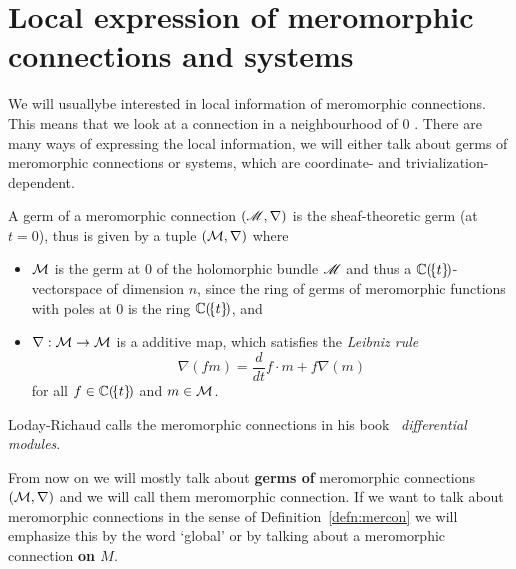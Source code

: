 \section{Local expression of meromorphic connections and systems}
We will usually\TODO[only?] be interested in local information of meromorphic
connections.  This means that we look at a connection in a neighbourhood of $0$
.
There are many ways of expressing the local information, we will either talk
about germs of meromorphic connections or systems, which are coordinate-
and trivialization-dependent.
\begin{prop}
  A germ of a meromorphic connection $(\mathscr{M},\nabla)$ is the sheaf-theoretic
  germ (at $t=0$), thus is given by a tuple $(\mathcal{M},\nabla)$ where
  \begin{itemize}
    \item $\mathcal{M}$ is the germ at $0$ of the holomorphic bundle $\mathscr{M}$ and thus a
      $\mathbb{C}(\!\{t\}\!)$-vectorspace of dimension $n$, since the ring of germs of
      meromorphic functions with poles at $0$ is the ring $\mathbb{C}(\!\{t\}\!)$, and
    \item $\nabla:\mathcal{M}\to \mathcal{M}$ is a additive map, which
      satisfies the \emph{Leibniz rule}
      \[
        \nabla(fm)=\frac{d}{dt} f\cdot m + f\nabla(m)
      \]
      for all $f\in\mathbb{C}(\!\{t\}\!)$ and $m\in \mathcal{M}$.
  \end{itemize}
  \begin{comment}
      \begin{s-rem}
      \marginnote{\cite{sabbah2007isomonodromic}}
      It is a $(\C(\!\{t\}\!),\nabla)$-vectorspace.
    \end{s-rem}
  \end{comment}
  \begin{s-rem}
    Loday-Richaud calls the meromorphic connections in his
    book~\cite[Def.4.2.1]{Loday2014} \emph{differential modules}.
  \end{s-rem}
\end{prop}
\begin{rem}\label{rem:GlobalNothingGerm}
  From now on we will mostly talk about \textbf{germs of} meromorphic
  connections $(\mathcal{M},\nabla)$ and we will call them meromorphic connection. If
  we want to talk about meromorphic connections in the sense of
  Definition~\ref{defn:mercon} we will emphasize this by the word `global' or
  by talking about a meromorphic connection \textbf{on $M$}.
\end{rem}
